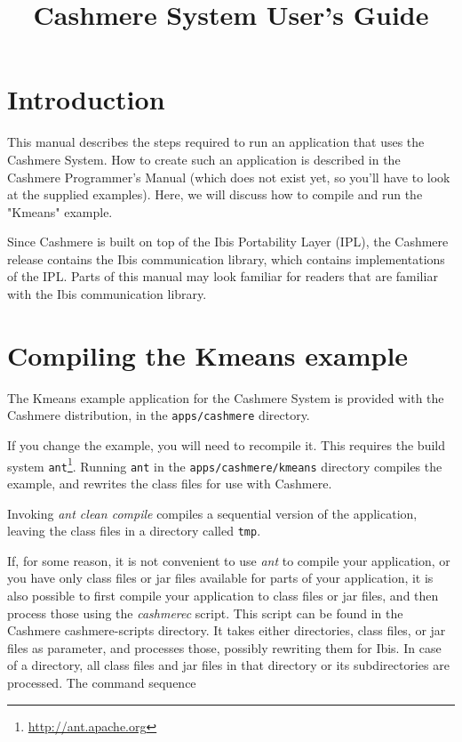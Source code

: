 \documentclass[a4paper,10pt]{article}
\begin{document}
\title{Cashmere System User's Guide}

\maketitle

\section{Introduction}

This manual describes the steps required to run an application that
uses the Cashmere System. How to create such an application
is described in the Cashmere Programmer's Manual (which does not exist yet,
so you'll have to look at the supplied examples).
Here, we will discuss how to compile and run the "Kmeans" example.

Since Cashmere is built on top of the Ibis Portability Layer (IPL),
the Cashmere release contains the Ibis communication library, which contains
implementations of the IPL. Parts of this manual may look familiar for
readers that are familiar with the Ibis communication library.

\section{Compiling the Kmeans example}

The Kmeans example application for the Cashmere System is
provided with the Cashmere distribution, in the \texttt{apps/cashmere} directory.

If you change the example, you will need to recompile it. This
requires the build system \texttt{ant}\footnote{\url{http://ant.apache.org}}.
Running \texttt{ant} in the \texttt{apps/cashmere/kmeans} directory compiles
the example, and rewrites the class files for use with Cashmere.

Invoking \emph{ant clean compile} compiles a sequential version
of the application,
leaving the class files in a directory called \texttt{tmp}.

If, for some reason, it is not convenient to use \emph{ant} to compile
your application, or you have only class files or jar files available
for parts of your application, it is also possible to first compile
your application to class files or jar files, and then process those
using the \emph{cashmerec} script. This script can be found in the Cashmere
cashmere-scripts directory. It takes either directories, class files, or jar
files as parameter, and processes those, possibly rewriting them for Ibis.
In case of a directory, all class files and jar files in that directory or
its subdirectories are processed. The command sequence
\end{document}
